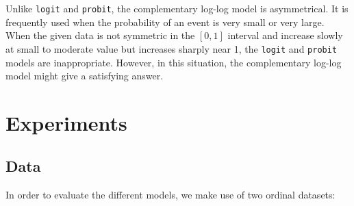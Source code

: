\documentclass[journal]{IEEEtran}
\begin{document}
	Unlike \texttt{logit} and \texttt{probit}, the complementary log-log model is asymmetrical. It is frequently used when the probability of an event is very small or very large. When the given data is not symmetric in the $[0,1]$ interval and increase slowly at small to moderate value but increases sharply near 1, the \texttt{logit} and \texttt{probit} models are inappropriate. However, in this situation, the complementary log-log model might give a satisfying answer.
	
	\section{Experiments}
	\label{sect:experiments}
	\subsection{Data}
	In order to evaluate the different models, we make use of two ordinal datasets:
	
\end{document}
